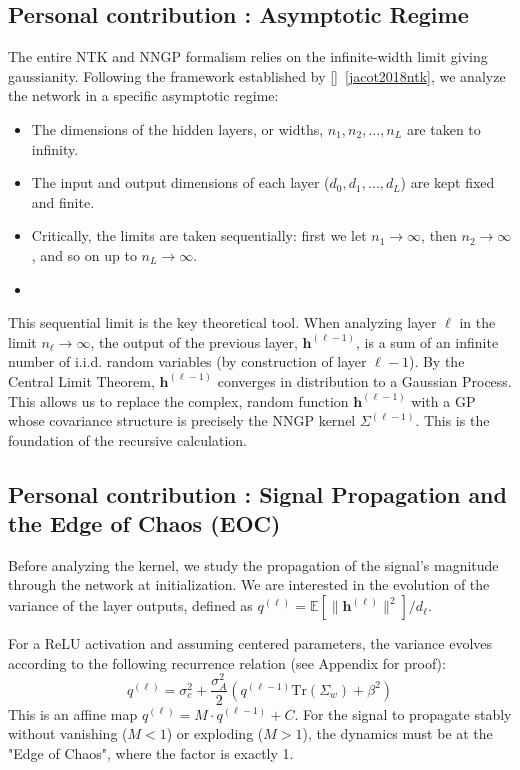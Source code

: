 \documentclass[a4paper]{article}
\theoremstyle{plain}
\theoremstyle{definition}
\theoremstyle{remark}
\begin{document}
\subsection{Personal contribution : Asymptotic Regime}
The entire NTK and NNGP formalism relies on the infinite-width limit giving gaussianity. Following the framework established by []~\ref{jacot2018ntk}, we analyze the network in a specific asymptotic regime:
\begin{itemize}
    \item The dimensions of the hidden layers, or widths, $n_1, n_2, \dots, n_L$ are taken to infinity.
    \item The input and output dimensions of each layer ($d_0, d_1, \dots, d_L$) are kept fixed and finite.
    \item Critically, the limits are taken sequentially: first we let $n_1 \to \infty$, then $n_2 \to \infty$, and so on up to $n_L \to \infty$.
    \item 
\end{itemize}
\begin{tcolorbox}[colback=green!5,colframe=green!80!black,title={\textbf{Remark: Sequential Limit as Key Theoretical Tool}},enhanced,drop shadow,boxrule=2pt]
This sequential limit is the key theoretical tool. When analyzing layer $\ell$ in the limit $n_\ell \to \infty$, the output of the previous layer, $\bm{h}^{(\ell-1)}$, is a sum of an infinite number of i.i.d. random variables (by construction of layer $\ell-1$). By the Central Limit Theorem, $\bm{h}^{(\ell-1)}$ converges in distribution to a Gaussian Process. This allows us to replace the complex, random function $\bm{h}^{(\ell-1)}$ with a GP whose covariance structure is precisely the NNGP kernel $\Sigma^{(\ell-1)}$. This is the foundation of the recursive calculation.
\end{tcolorbox}

\subsection{Personal contribution : Signal Propagation and the Edge of Chaos (EOC)}
Before analyzing the kernel, we study the propagation of the signal's magnitude through the network at initialization. We are interested in the evolution of the variance of the layer outputs, defined as $q^{(\ell)} = \mathbb{E}[\|\bm{h}^{(\ell)}\|^2]/d_\ell$.

For a ReLU activation and assuming centered parameters, the variance evolves according to the following recurrence relation (see Appendix for proof):
\begin{equation}
    q^{(\ell)} = \sigma_c^2 + \frac{\sigma_A^2}{2} \left( q^{(\ell-1)}\text{Tr}(\Sigma_w) + \beta^2 \right)
\end{equation}
This is an affine map $q^{(\ell)} = M \cdot q^{(\ell-1)} + C$. For the signal to propagate stably without vanishing ($M<1$) or exploding ($M>1$), the dynamics must be at the "Edge of Chaos", where the factor is exactly 1.
\end{document}
